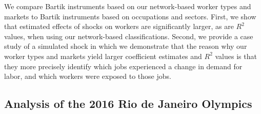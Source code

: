 \documentclass[12pt]{article}
\theoremstyle{definition}
\theoremstyle{plain}
\begin{document}
We compare Bartik instruments based on our network-based worker types and markets to Bartik instruments based on occupations and sectors. First, we show that estimated effects of shocks on workers are significantly larger, as are $R^2$ values, when using our network-based classifications. Second, we provide a case study of a simulated shock in which we demonstrate that the reason why our worker types and markets yield larger coefficient estimates and $R^2$ values is that they more precisely identify which jobs experienced a change in demand for labor, and which workers were exposed to those jobs. 




\subsection{Analysis of the 2016 Rio de Janeiro Olympics}

\label{sec:reduced_form_real_olympics}

\end{document}
